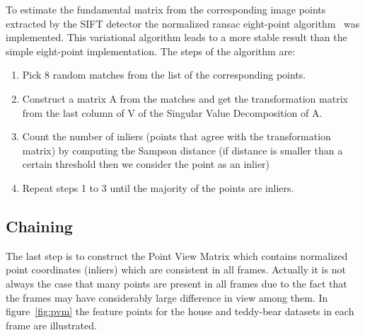 To estimate the fundamental matrix from the corresponding image points extracted by the SIFT detector the normalized ransac eight-point algorithm~\cite{eight-point} was implemented. This variational algorithm leads to a more stable result than the simple eight-point implementation. The steps of the algorithm are:

\begin{enumerate}[1]
  \item Pick 8 random matches from the list of the corresponding points.
  \item Construct a matrix A from the matches and get the transformation matrix from the last column of V of the Singular Value Decomposition of A.
  \item Count the number of inliers (points that agree with the transformation matrix) by computing the Sampson distance (if distance is smaller than a certain threshold then we consider the point as an inlier)
  \item Repeat steps 1 to 3 until the majority of the points are inliers.
\end{enumerate}


\subsection{Chaining}
The last step is to construct the Point View Matrix which contains normalized point coordinates (inliers) which are consistent in all frames. Actually it is not always the case that many points are present in all frames due to the fact that the frames may have considerably large difference in view among them. In figure~\ref{fig:pvm} the feature points for the house and teddy-bear datasets in each frame are illustrated.



